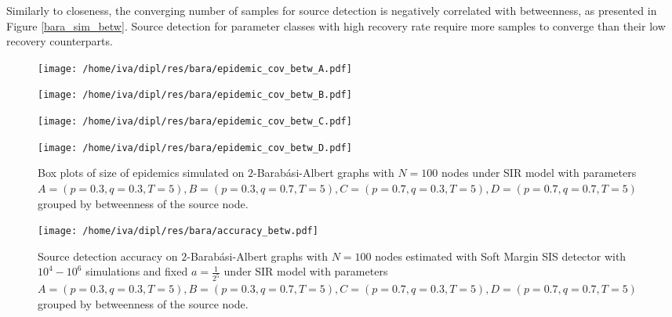\documentclass[times, utf8, diplomski]{fer}
\begin{document}
Similarly to closeness, the converging number of samples for source detection is negatively correlated with betweenness, as presented in Figure \ref{bara_sim_betw}.  Source detection for parameter classes with high recovery rate require more samples to converge than their low recovery counterparts.

\begin{figure}[H]
\begin{minipage}{\textwidth}
\begin{minipage}{0.5\textwidth}
\texttt{[image: /home/iva/dipl/res/bara/epidemic\_cov\_betw\_A.pdf]}
\end{minipage}
\begin{minipage}{0.5\textwidth}
\texttt{[image: /home/iva/dipl/res/bara/epidemic\_cov\_betw\_B.pdf]}
\end{minipage}
\begin{minipage}{0.5\textwidth}
\texttt{[image: /home/iva/dipl/res/bara/epidemic\_cov\_betw\_C.pdf]}
\end{minipage}
\begin{minipage}{0.5\textwidth}
\texttt{[image: /home/iva/dipl/res/bara/epidemic\_cov\_betw\_D.pdf]}
\end{minipage}
\caption{Box plots of size of epidemics simulated on  $2$-Barab\'{a}si-Albert graphs  with $N=100$ nodes under SIR model with parameters $A = (p=0.3, q=0.3, T=5), B = (p=0.3, q=0.7, T=5), C = (p=0.7, q=0.3, T=5), D = (p=0.7, q=0.7, T=5)$ grouped by betweenness of the source node.}
\label{bara_betw_cov}
\end{minipage}
\begin{minipage}{\textwidth}
\center
\texttt{[image: /home/iva/dipl/res/bara/accuracy\_betw.pdf]}
\caption{Source detection accuracy on  $2$-Barab\'{a}si-Albert graphs  with $N=100$ nodes estimated with Soft Margin SIS detector with $10^4 - 10^6$ simulations and fixed $a = \frac{1}{2^5}$ under SIR model with parameters $A = (p=0.3, q=0.3, T=5), B = (p=0.3, q=0.7, T=5), C = (p=0.7, q=0.3, T=5), D = (p=0.7, q=0.7, T=5)$ grouped by betweenness of the source node.}
\label{bara_acc_betw}
\end{minipage}
\end{figure}
\end{document}
